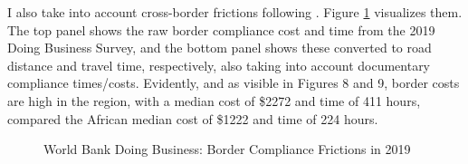 \documentclass[a4paper]{article}
\begin{document}
I also take into account cross-border frictions following \citet{krantz2024optimal}. Figure \ref{fig:DB_TAB} visualizes them. The top panel shows the raw border compliance cost and time from the 2019 Doing Business Survey, and the bottom panel shows these converted to road distance and travel time, respectively, also taking into account documentary compliance times/costs. Evidently, and as visible in \citet{krantz2024optimal} Figures 8 and 9, border costs are high in the region, with a median cost of \$2272 and time of 411 hours, compared the African median cost of \$1222 and time of 224 hours. 


  
  
\begin{figure}[H] \vspace{-2mm}
\centering
\caption{\label{fig:DB_TAB} World Bank Doing Business: Border Compliance Frictions in 2019}
\vspace{2mm}
\end{figure}
\end{document}
